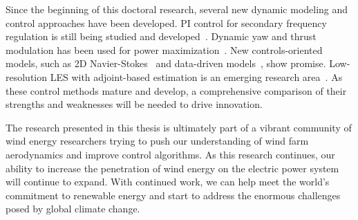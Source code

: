 Since the beginning of this doctoral research, several new dynamic modeling and control approaches have been developed. PI control for secondary frequency regulation is still being studied and developed~\cite{vanWingerden2017a}. Dynamic yaw and thrust modulation has been used for power maximization~\cite{Munters2018a}. New controls-oriented models, such as 2D Navier-Stokes~\cite{Boersma2018a} and data-driven models~\cite{King2018a, Adcock2018a}, show promise. Low-resolution LES with adjoint-based estimation is an emerging research area~\cite{Bauweraerts2018a}. As these control methods mature and develop, a comprehensive comparison of their strengths and weaknesses will be needed to drive innovation.

The research presented in this thesis is ultimately part of a vibrant community of wind energy researchers trying to push our understanding of wind farm aerodynamics and improve control algorithms. As this research continues, our ability to increase the penetration of wind energy on the electric power system will continue to expand. With continued work, we can help meet the world's commitment to renewable energy and start to address the enormous challenges posed by global climate change.






